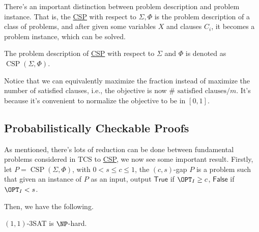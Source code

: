 \begin{remark}
	There's an important distinction between problem description and problem instance. That is, the \hyperref[prb:CSP]{CSP} with respect to \(\Sigma, \Phi \) is the problem description of a class of problems, and after given some variables \(X\) and clauses \(C_i\), it becomes a problem instance, which can be solved.
\end{remark}

\begin{notation}
	The problem description of \hyperref[prb:CSP]{CSP} with respect to \(\Sigma \) and \(\Phi \) is denoted as \(\mathop{\mathrm{CSP}}(\Sigma , \Phi )\).
\end{notation}

Notice that we can equivalently maximize the fraction instead of maximize the number of satisfied clauses, i.e., the objective is now \(\#\text{ satisfied clauses} / m \). It's because it's convenient to normalize the objective to be in \([0, 1]\).

\begin{remark}

\end{remark}

\begin{eg}

\end{eg}

\subsection{Probabilistically Checkable Proofs}
As mentioned, there's lots of reduction can be done between fundamental problems considered in TCS to \hyperref[prb:CSP]{CSP}, we now see some important result. Firstly, let \(P = \mathop{\mathrm{CSP}}(\Sigma , \Phi )\), with \(0 < s \leq c \leq 1\), the \((c, s)\)-gap \(P\) is a problem such that given an instance of \(P\) as an input, output \(\textsf{True}\) if \(\OPT_I \geq c\), \(\textsf{False}\) if \(\OPT_I < s\).

\begin{remark}

\end{remark}

Then, we have the following.

\begin{theorem}
	\((1, 1)\)-3SAT is \(\NP\)-hard.
\end{theorem}

